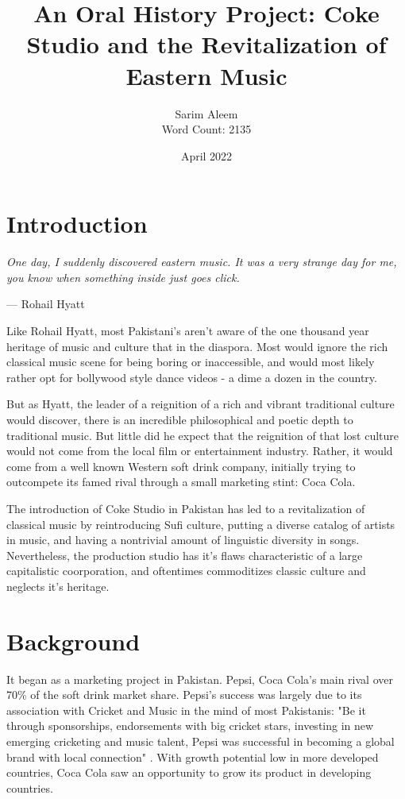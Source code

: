 \documentclass{article}
\title{An Oral History Project: Coke Studio and the Revitalization of Eastern Music}
\date{April 2022}
\author{Sarim Aleem \\ Word Count: 2135}
\begin{document}
  \maketitle

  
  \section{Introduction}

  \epigraph{\itshape One day, I suddenly discovered eastern music. It was a very
  strange day for me, you know when something inside just goes click.}{--- Rohail Hyatt}

  
  Like Rohail Hyatt, most Pakistani's aren't aware of the one thousand year
  heritage of music and culture that in the diaspora. Most would ignore the rich
  classical music scene for being boring or inaccessible, and would most likely
  rather opt for bollywood style dance videos - a dime a dozen in the country. 

  But as Hyatt, the leader of a reignition of a rich and vibrant traditional
  culture would discover, there is an incredible philosophical and poetic depth
  to traditional music.  But little did he expect that the reignition of that
  lost culture would not come from the local film or entertainment industry.
  Rather, it would come from a well known Western soft drink company, initially
  trying to outcompete its famed rival through a small marketing stint: Coca
  Cola. 

  
  The introduction of Coke Studio in Pakistan has led to a revitalization of
  classical music by reintroducing Sufi culture, putting a diverse catalog of
  artists in music, and having a nontrivial amount of linguistic diversity in
  songs.  Nevertheless, the production studio has it's flaws characteristic of a
  large capitalistic coorporation, and oftentimes commoditizes classic culture
  and neglects it's heritage. 

  \section{Background}

  It began as a marketing project in Pakistan. Pepsi, Coca Cola's main rival
  over 70\% of the soft drink market share. Pepsi's success was largely due to
  its association with Cricket and Music in the mind of most Pakistanis: "Be it
  through sponsorships, endorsements with big cricket stars, investing in new
  emerging cricketing and music talent, Pepsi was successful in becoming a
  global brand with local connection" \autocite{Chibmedium}. With growth 
  potential low in more developed countries, Coca Cola saw an opportunity to 
  grow its product in developing countries. 
\end{document}
